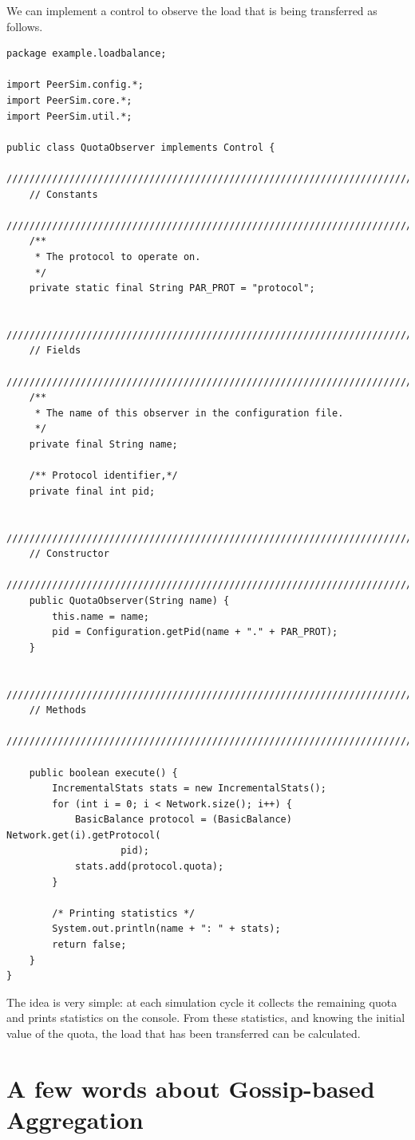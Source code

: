 \documentclass[a4paper,11pt]{article}
\begin{document}
We can implement a control to observe the load that is being transferred
as follows.

\footnotesize
\begin{verbatim}
package example.loadbalance;

import PeerSim.config.*;
import PeerSim.core.*;
import PeerSim.util.*;

public class QuotaObserver implements Control {
    /////////////////////////////////////////////////////////////////////////
    // Constants
    /////////////////////////////////////////////////////////////////////////
    /**
     * The protocol to operate on.
     */
    private static final String PAR_PROT = "protocol";

    /////////////////////////////////////////////////////////////////////////
    // Fields
    /////////////////////////////////////////////////////////////////////////
    /**
     * The name of this observer in the configuration file.
     */
    private final String name;

    /** Protocol identifier,*/
    private final int pid;

    /////////////////////////////////////////////////////////////////////////
    // Constructor
    /////////////////////////////////////////////////////////////////////////
    public QuotaObserver(String name) {
        this.name = name;
        pid = Configuration.getPid(name + "." + PAR_PROT);
    }

    /////////////////////////////////////////////////////////////////////////
    // Methods
    /////////////////////////////////////////////////////////////////////////

    public boolean execute() {
        IncrementalStats stats = new IncrementalStats();
        for (int i = 0; i < Network.size(); i++) {
            BasicBalance protocol = (BasicBalance) Network.get(i).getProtocol(
                    pid);
            stats.add(protocol.quota);
        }

        /* Printing statistics */
        System.out.println(name + ": " + stats);
        return false;
    }
}
\end{verbatim}
\normalsize

The idea is very simple: at each simulation cycle it collects
the remaining quota and prints statistics on the console.
From these statistics, and knowing the initial value of the quota,
the load that has been transferred can be calculated.


\appendix
\section{\label{sec:Appendix-A-aggregation}A few words about
Gossip-based Aggregation}
\end{document}
